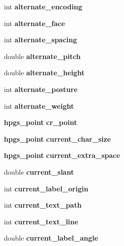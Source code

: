 \begin{Indent}{\bf }\par
\begin{CompactItemize}
\item 
int {\bf alternate\_\-encoding}
\item 
int \textbf{alternate\_\-face}\label{structhpgs__reader__st_d4664cdeb2e9140523d233d3618ab467}

\item 
int \textbf{alternate\_\-spacing}\label{structhpgs__reader__st_973a5b831cb3c9f2daecfa9079f88508}

\item 
double \textbf{alternate\_\-pitch}\label{structhpgs__reader__st_6779bb010dc5a5979e7e9181915cf4c2}

\item 
double \textbf{alternate\_\-height}\label{structhpgs__reader__st_ce276698951871437095e60a206ee947}

\item 
int \textbf{alternate\_\-posture}\label{structhpgs__reader__st_62b354f8911769f700b57db1845e41ac}

\item 
int \textbf{alternate\_\-weight}\label{structhpgs__reader__st_5d9273b00c3e306a9b80afd92709db24}

\end{CompactItemize}
\end{Indent}
\begin{Indent}{\bf }\par
\begin{CompactItemize}
\item 
{\bf hpgs\_\-point} {\bf cr\_\-point}
\item 
{\bf hpgs\_\-point} \textbf{current\_\-char\_\-size}\label{structhpgs__reader__st_89602a47d739d1447cec5c9512206217}

\item 
{\bf hpgs\_\-point} \textbf{current\_\-extra\_\-space}\label{structhpgs__reader__st_f735f045829c8adcdfc25e02a20cf0a7}

\item 
double \textbf{current\_\-slant}\label{structhpgs__reader__st_0b86cd57160128c8ce27ee6f4792b97f}

\item 
int \textbf{current\_\-label\_\-origin}\label{structhpgs__reader__st_8bf22f602c40554105e0a6d7f442fe12}

\item 
int \textbf{current\_\-text\_\-path}\label{structhpgs__reader__st_9e6eedcf159c66ae00b33a5cb219f981}

\item 
int \textbf{current\_\-text\_\-line}\label{structhpgs__reader__st_fa2b325c62bdc91cb9e7e620f03fb2e1}

\item 
double \textbf{current\_\-label\_\-angle}\label{structhpgs__reader__st_c648cfbddbe85a41e8c5bf8a5d600cd3}

\end{CompactItemize}
\end{Indent}


